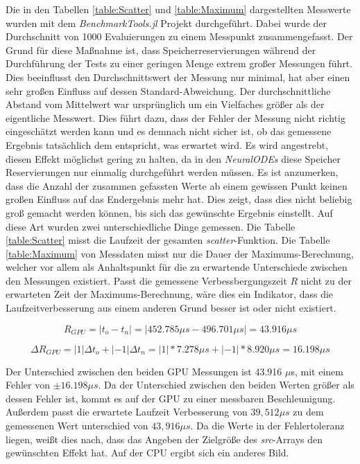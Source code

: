 Die in den Tabellen \ref{table:Scatter} und \ref{table:Maximum} dargestellten Messwerte wurden mit dem \textit{BenchmarkTools.jl} Projekt durchgeführt.
Dabei wurde der Durchschnitt von 1000 Evaluierungen zu einem Messpunkt zusammengefasst.
Der Grund für diese Maßnahme ist, dass Speicherreservierungen während der Durchführung der Tests zu einer geringen Menge extrem großer 
Messungen führt.
Dies beeinflusst den Durchschnittswert der Messung nur minimal, hat aber einen sehr großen Einfluss auf dessen Standard-Abweichung.
Der durchschnittliche Abstand vom Mittelwert war ursprünglich
um ein Vielfaches größer als der eigentliche Messwert.
Dies führt dazu, dass der Fehler der Messung nicht richtig eingeschätzt werden kann und es demnach nicht sicher ist, ob das gemessene Ergebnis tatsächlich dem entspricht, was erwartet wird.
Es wird angestrebt, diesen Effekt möglichst gering zu halten, da in den \textit{NeuralODEs} diese Speicher Reservierungen nur einmalig durchgeführt werden müssen.
Es ist anzumerken, dass die Anzahl der zusammen gefassten Werte ab einem gewissen Punkt keinen großen Einfluss auf das Endergebnis mehr hat.
Dies zeigt, dass dies nicht beliebig groß gemacht werden können, bis sich das gewünschte Ergebnis einstellt.
Auf diese Art wurden zwei unterschiedliche Dinge gemessen.
Die Tabelle \ref{table:Scatter} misst die Laufzeit der gesamten \textit{scatter}-Funktion.
Die Tabelle \ref{table:Maximum} von Messdaten misst nur die Dauer der Maximums-Berechnung, 
welcher vor allem als Anhaltspunkt für die zu erwartende Unterschiede zwischen den Messungen existiert.
Passt die gemessene Verbessbergungszeit $R$ nicht zu der erwarteten Zeit der Maximums-Berechnung, wäre dies ein Indikator, dass die Laufzeitverbesserung aus einem anderen Grund besser ist oder nicht existiert.

$$
 R_{GPU} = | t_o - t_n | = | 452.785 \mu s - 496.701 \mu s | = 43.916 \mu s
$$

$$
 \Delta R_{GPU} = | 1 | \Delta t_o + |-1| \Delta t_n = | 1| * 7.278 \mu s +  |-1| * 8.920 \mu s = 16.198 \mu s
$$

Der Unterschied zwischen den beiden GPU Messungen ist 43.916 $\mu$s, mit einem Fehler von $\pm 16.198 \mu s$.
Da der Unterschied zwischen den beiden Werten größer als dessen Fehler ist, kommt es auf der GPU zu einer messbaren Beschleunigung.
Außerdem passt die erwartete Laufzeit Verbesserung von $39,512 \mu s$ zu dem gemessenen Wert unterschied von $43,916 \mu s$.
Da die Werte in der Fehlertoleranz liegen, weißt dies nach, dass das Angeben der Zielgröße des \textit{src}-Arrays den gewünschten Effekt hat.
Auf der CPU ergibt sich ein anderes Bild.

